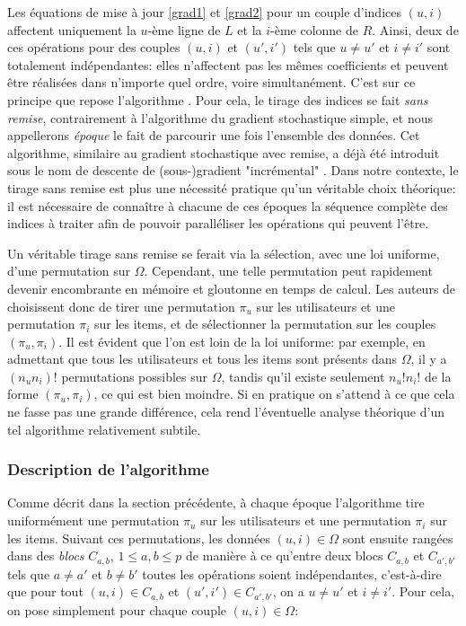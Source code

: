 \documentclass[10pt,a4paper]{article}
\begin{document}
Les équations de mise à jour \eqref{grad1} et \eqref{grad2} pour un couple d'indices $(u,i)$ affectent uniquement la $u$-ème ligne de $L$ et la $i$-ème colonne de $R$. Ainsi, deux de ces opérations pour des couples $(u,i)$ et $(u',i')$ tels que $u \neq u'$ et $i \neq i'$ sont totalement indépendantes: elles n'affectent pas les mêmes coefficients et peuvent être réalisées dans n'importe quel ordre, voire simultanément. C'est sur ce principe que repose l'algorithme \jel \cite{jelly}. Pour cela, le tirage des indices se fait \emph{sans remise}, contrairement à l'algorithme du gradient stochastique simple, et nous appellerons \emph{époque} le fait de parcourir une fois l'ensemble des données. Cet algorithme, similaire au gradient stochastique avec remise, a déjà été introduit sous le nom de descente de (sous-)gradient "incrémental" \cite{nedic}. Dans notre contexte, le tirage sans remise est plus une nécessité pratique qu'un véritable choix théorique: il est nécessaire de connaître à chacune de ces époques la séquence complète des indices à traiter afin de pouvoir paralléliser les opérations qui peuvent l'être.

Un véritable tirage sans remise se ferait via la sélection, avec une loi uniforme, d'une permutation sur $\Omega$. Cependant, une telle permutation peut rapidement devenir encombrante en mémoire et gloutonne en temps de calcul. Les auteurs de \jel  choisissent donc de tirer une permutation $\pi_u$ sur les utilisateurs et une permutation $\pi_i$ sur les items, et de sélectionner la permutation sur les couples $(\pi_u,\pi_i)$. Il est évident que l'on est loin de la loi uniforme: par exemple, en admettant que tous les utilisateurs et tous les items sont présents dans $\Omega$, il y a $(n_un_i)!$ permutations possibles sur $\Omega$, tandis qu'il existe seulement $n_u!n_i!$ de la forme $(\pi_u,\pi_i)$, ce qui est bien moindre. Si en pratique on s'attend à ce que cela ne fasse pas une grande différence, cela rend l'éventuelle analyse théorique d'un tel algorithme relativement subtile.

\subsubsection*{Description de l'algorithme}

Comme décrit dans la section précédente, à chaque époque l'algorithme tire uniformément une permutation $\pi_u$ sur les utilisateurs et une permutation $\pi_i$ sur les items. Suivant ces permutations, les données $(u,i) \in \Omega$ sont ensuite rangées dans des \emph{blocs} $C_{a,b}$, $1 \leq a,b \leq p$ de manière à ce qu'entre deux blocs $C_{a,b}$ et $C_{a',b'}$ tels que $a \neq a'$ et $b \neq b'$ toutes les opérations soient indépendantes, c'est-à-dire que pour tout $(u,i) \in C_{a,b}$ et $(u',i') \in C_{a',b'}$, on a $u \neq u'$ et $i \neq i'$. Pour cela, on pose simplement pour chaque couple $(u,i) \in \Omega$:
\end{document}
